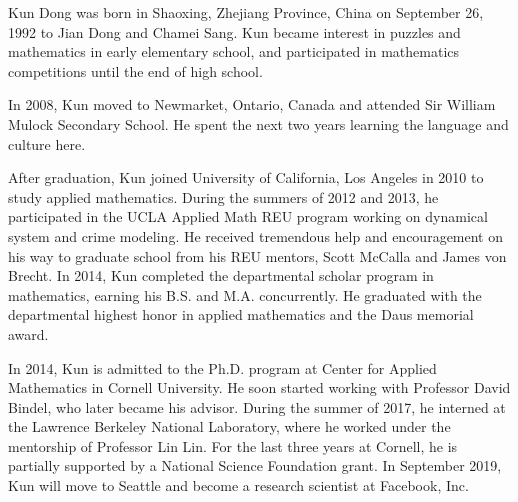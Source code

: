 Kun Dong was born in Shaoxing, Zhejiang Province, China on September 26, 1992 to
Jian Dong and Chamei Sang. Kun became interest in puzzles and mathematics in
early elementary school, and participated in mathematics competitions until the
end of high school.

In 2008, Kun moved to Newmarket, Ontario, Canada and attended Sir William Mulock
Secondary School. He spent the next two years learning the language and culture
here.

After graduation, Kun joined University of California, Los Angeles in 2010 to
study applied mathematics. During the summers of 2012 and 2013, he participated
in the UCLA Applied Math REU program working on dynamical system and crime
modeling. He received tremendous help and encouragement on his way to
graduate school from his REU mentors, Scott McCalla and James von Brecht. In
2014, Kun completed the departmental scholar program in mathematics, earning his
B.S. and M.A. concurrently. He graduated with the departmental highest
honor in applied mathematics and the Daus memorial award.

In 2014, Kun is admitted to the Ph.D. program at Center for Applied Mathematics
in Cornell University. He soon started working with Professor David Bindel, who
later became his advisor. During the summer of 2017, he interned at the Lawrence
Berkeley National Laboratory, where he worked under the mentorship of Professor
Lin Lin. For the last three years at Cornell, he is partially supported by a
National Science Foundation grant. In September 2019, Kun will move to Seattle
and become a research scientist at Facebook, Inc.